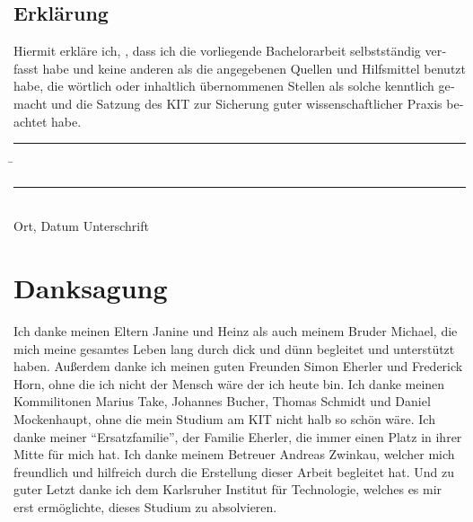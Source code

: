 \documentclass[parskip=full,12pt,a4paper,twoside,headings=openright]{scrreprt}
\begin{document}
\tableofcontents










\begin{otherlanguage}{ngerman}
\chapter*{Erklärung}
\pagestyle{empty}

  \vspace{20mm}
  Hiermit erkläre ich, \theauthor, dass ich die vorliegende Bachelorarbeit selbst\-ständig
verfasst habe und keine anderen als die angegebenen Quellen und Hilfsmittel
benutzt habe, die wörtlich oder inhaltlich übernommenen Stellen als solche kenntlich gemacht und
die Satzung des KIT zur Sicherung guter wissenschaftlicher Praxis beachtet habe.
  \vspace{20mm}
  \begin{tabbing}
  \rule{4cm}{.4pt}\hspace{1cm} \= \rule{7cm}{.4pt} \\
 Ort, Datum \> Unterschrift
  \end{tabbing}
\end{otherlanguage}

\chapter*{Danksagung}
\pagestyle{empty}

Ich danke meinen Eltern Janine und Heinz als auch meinem Bruder Michael, die mich meine gesamtes Leben lang durch dick und dünn
begleitet und unterstützt haben. Außerdem danke ich meinen guten Freunden Simon Eherler und Frederick Horn, ohne die ich nicht der
Mensch wäre der ich heute bin. Ich danke meinen Kommilitonen Marius Take, Johannes Bucher, Thomas Schmidt und Daniel Mockenhaupt,
ohne die mein Studium am KIT nicht halb so schön wäre. Ich danke meiner "`Ersatzfamilie"', der Familie Eherler,
die immer einen Platz in ihrer Mitte für mich hat. Ich danke meinem Betreuer Andreas Zwinkau, welcher
mich freundlich und hilfreich durch die Erstellung dieser Arbeit begleitet hat. Und zu guter Letzt
danke ich dem Karlsruher Institut für Technologie, welches es mir erst ermöglichte, dieses Studium zu absolvieren.

\pagestyle{fancy}
\appendix

%
\end{document}
